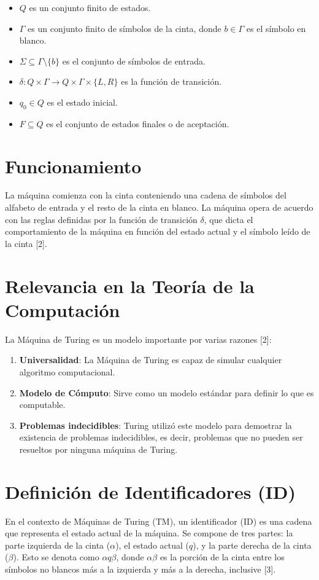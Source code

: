 \documentclass[11pt]{article} %
\begin{document}
	\begin{itemize}
		\item \( Q \) es un conjunto finito de estados.
		\item \( \Gamma \) es un conjunto finito de símbolos de la cinta, donde \( b \in \Gamma \) es el símbolo en blanco.
		\item \( \Sigma \subseteq \Gamma \setminus \{b\} \) es el conjunto de símbolos de entrada.
		\item \( \delta: Q \times \Gamma \rightarrow Q \times \Gamma \times \{L, R\} \) es la función de transición.
		\item \( q_0 \in Q \) es el estado inicial.
		\item \( F \subseteq Q \) es el conjunto de estados finales o de aceptación.
	\end{itemize}
	
	\section{Funcionamiento}
	La máquina comienza con la cinta conteniendo una cadena de símbolos del alfabeto de entrada y el resto de la cinta en blanco. La máquina opera de acuerdo con las reglas definidas por la función de transición \( \delta \), que dicta el comportamiento de la máquina en función del estado actual y el símbolo leído de la cinta [2].
	
	\section{Relevancia en la Teoría de la Computación}
	La Máquina de Turing es un modelo importante por varias razones [2]:
	
	\begin{enumerate}
		\item \textbf{Universalidad}: La Máquina de Turing es capaz de simular cualquier algoritmo computacional.
		\item \textbf{Modelo de Cómputo}: Sirve como un modelo estándar para definir lo que es computable.
		\item \textbf{Problemas indecidibles}: Turing utilizó este modelo para demostrar la existencia de problemas indecidibles, es decir, problemas que no pueden ser resueltos por ninguna máquina de Turing.
	\end{enumerate}
	
	\section{Definición de Identificadores (ID)}
	En el contexto de Máquinas de Turing (TM), un identificador (ID) es una cadena que representa el estado actual de la máquina. Se compone de tres partes: la parte izquierda de la cinta (\(\alpha\)), el estado actual (\(q\)), y la parte derecha de la cinta (\(\beta\)). Esto se denota como \(\alpha q\beta\), donde \(\alpha\beta\) es la porción de la cinta entre los símbolos no blancos más a la izquierda y más a la derecha, inclusive [3].
	
\end{document}
